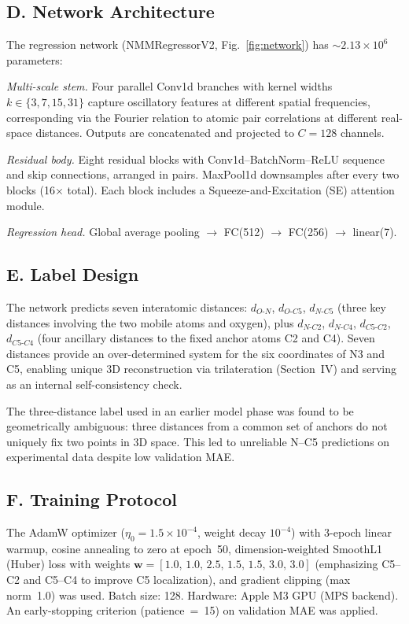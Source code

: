 \documentclass[12pt]{article}
\begin{document}
\subsection*{D.\; Network Architecture}

The regression network (NMMRegressorV2,
Fig.~\ref{fig:network}) has ${\sim}2.13\times10^6$ parameters:

\noindent\textit{Multi-scale stem.} Four parallel Conv1d branches
with kernel widths $k \in \{3,7,15,31\}$ capture oscillatory features
at different spatial frequencies, corresponding via the Fourier
relation to atomic pair correlations at different real-space distances.
Outputs are concatenated and projected to $C = 128$ channels.

\noindent\textit{Residual body.} Eight residual blocks\cite{He2016}
with Conv1d--BatchNorm--ReLU sequence and skip connections, arranged
in pairs. MaxPool1d downsamples after every two blocks (16$\times$
total). Each block includes a Squeeze-and-Excitation (SE)
attention\cite{Hu2018} module.

\noindent\textit{Regression head.} Global average pooling $\to$
FC(512) $\to$ FC(256) $\to$ linear(7).

\subsection*{E.\; Label Design}

The network predicts seven interatomic distances:
$d_{O\text{-}N}$, $d_{O\text{-}C5}$, $d_{N\text{-}C5}$ (three key
distances involving the two mobile atoms and oxygen), plus
$d_{N\text{-}C2}$, $d_{N\text{-}C4}$, $d_{C5\text{-}C2}$,
$d_{C5\text{-}C4}$ (four ancillary distances to the fixed anchor
atoms C2 and C4). Seven distances provide an over-determined system
for the six coordinates of N3 and C5, enabling unique 3D
reconstruction via trilateration (Section~IV) and serving as an
internal self-consistency check.

The three-distance label used in an earlier model phase was found to
be geometrically ambiguous: three distances from a common set of
anchors do not uniquely fix two points in 3D space. This led to
unreliable N--C5 predictions on experimental data despite low
validation MAE.

\subsection*{F.\; Training Protocol}

The AdamW optimizer\cite{Loshchilov2019}
($\eta_0 = 1.5\times10^{-4}$, weight decay $10^{-4}$) with 3-epoch
linear warmup, cosine annealing to zero at epoch~50,
dimension-weighted SmoothL1 (Huber)
loss with weights $\mathbf{w} = [1.0,\,1.0,\,2.5,\,1.5,\,1.5,\,3.0,\,3.0]$
(emphasizing C5--C2 and C5--C4 to improve C5 localization), and
gradient clipping (max norm~1.0) was used. Batch size: 128.
Hardware: Apple M3 GPU (MPS backend). An early-stopping criterion
(patience~=~15) on validation MAE was applied.
\end{document}
